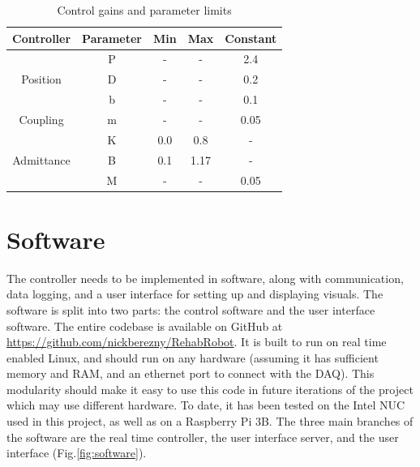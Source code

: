 \documentclass[12pt]{report}
\begin{document}
	\begin{table}[h] \label{tab:params}
	\centering
	\caption{Control gains and parameter limits}
	\begin{tabular}{c c c c c }
	\toprule
	Controller & Parameter & Min & Max & Constant  \\
	\midrule
	\rowcolor{gray!10} \cellcolor{white} & P & - & -  & 2.4  \\
	\multirow{-2}{*}{Position} \cellcolor{white} & D & - & - & 0.2 \\
	\midrule
	\rowcolor{gray!10} \cellcolor{white} & b & -  & -  & 0.1  \\
	\multirow{-2}{*}{Coupling} \cellcolor{white} & m & -  & -  & 0.05  \\
	\midrule
	\rowcolor{gray!10} \cellcolor{white} & K & 0.0 & 0.8  &  - \\
	\multirow{-1}{*}{Admittance} \cellcolor{white} & B & 0.1 & 1.17  & - \\
	\rowcolor{gray!10} \cellcolor{white} & M & - & -  & 0.05  \\
	\bottomrule
	\end{tabular}
	\end{table}	
	
	
			
	\section{Software} \label{sec:software} 

	The controller needs to be implemented in software, along with communication, data logging, and a user interface for setting up and displaying visuals. The software is split into two parts: the control software and the user interface software. The entire codebase is available on GitHub at \href{https://github.com/nickberezny/RehabRobot}{https://github.com/nickberezny/RehabRobot}. It is built to run on real time enabled Linux, and should run on any hardware (assuming it has sufficient memory and RAM, and an ethernet port to connect with the DAQ). This modularity should make it easy to use this code in future iterations of the project which may use different hardware. To date, it has been tested on the Intel NUC used in this project, as well as on a Raspberry Pi 3B. The three main branches of the software are the real time controller, the user interface server, and the user interface (Fig.\ref{fig:software}).
	
\end{document}
